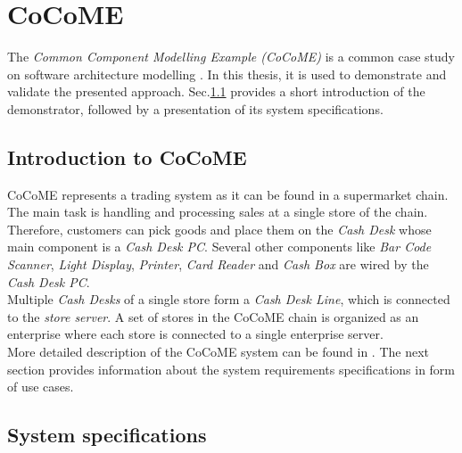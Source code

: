 \chapter{CoCoME}
\label{ch:CoCoME}
The \textit{Common Component Modelling Example (CoCoME)} is a common case study on software architecture modelling \cite{CoCoMEOld}\cite{CoCoMETechnical}. In this thesis, it is used to demonstrate and validate the presented approach. Sec.\ref{sec:CoCoME:Introduction} provides a short introduction of the demonstrator, followed by a presentation of its system specifications.


\section{Introduction to CoCoME}
\label{sec:CoCoME:Introduction}
CoCoME represents a trading system as it can be found in a supermarket chain. The main task is handling and processing sales at a single store of the chain. Therefore, customers can pick goods and place them on the \textit{Cash Desk} whose main component is a \textit{Cash Desk PC}. Several other components like \textit{Bar Code Scanner}, \textit{Light Display}, \textit{Printer}, \textit{Card Reader} and \textit{Cash Box} are wired by the  \textit{Cash Desk PC}. \\
Multiple  \textit{Cash Desks} of a single store form a  \textit{Cash Desk Line}, which is connected to the  \textit{store server}. A set of stores in the CoCoME chain is organized as an enterprise where each store is connected to a single enterprise server. \\
More detailed description of the CoCoME system can be found in \cite{CoCoMEOld}\cite{CoCoMETechnical}. The next section provides information about the system requirements specifications in form of use cases.
 


\section{System specifications}
\label{sec:CoCoME:systemSpecifications}
